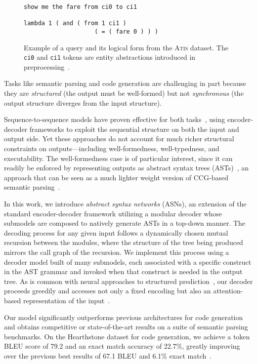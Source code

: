 \documentclass[11pt,a4paper]{article}
\newcommand{\Atis}{\textsc{Atis}\xspace}
\newcommand{\HS}{{\sc Hearthstone}\xspace}
\begin{document}
\begin{figure}[!t]
\footnotesize
\begin{verbatim}
show me the fare from ci0 to ci1 

lambda 1 ( and ( from 1 ci1 ) 
                    ( = ( fare 0 ) ) )
\end{verbatim}
\caption{Example of a query and its logical form from the \Atis dataset. The {\tt ci0} and {\tt ci1} tokens are entity abstractions introduced in preprocessing~\citep{Dong16Semantic}.\label{fig:lambda-example}}
\end{figure}



\noindent Tasks like semantic parsing and code generation are challenging in part because they are \emph{structured} (the output must be well-formed) but not \emph{synchronous} (the output structure diverges from the input structure).

Sequence-to-sequence models have proven effective for both tasks~\citep{Dong16Semantic,Ling16Code}, using encoder-decoder frameworks to exploit the sequential structure on both the input and output side. Yet these approaches do not account for much richer structural constraints on outputs---including well-formedness, well-typedness, and executability. The well-formedness case is of particular interest, since it can readily be enforced by representing outputs as abstract syntax trees (ASTs)~\citep{Aho06Compilers}, an approach that can be seen as a much lighter weight version of CCG-based semantic parsing~\citep{Zettlemoyer05Semantic}.

In this work, we introduce {\it abstract syntax networks} (ASNs), an extension of the standard encoder-decoder framework utilizing a modular decoder whose submodels are composed to natively generate ASTs in a top-down manner. The decoding process for any given input follows a dynamically chosen mutual recursion between the modules, where the structure of the tree being produced mirrors the call graph of the recursion. We implement this process using a decoder model built of many submodels, each associated with a specific construct in the AST grammar and invoked when that construct is needed in the output tree. As is common with neural approaches to structured prediction~\citep{Chen14Fast,Vinyals15Foreign}, our decoder proceeds greedily and accesses not only a fixed encoding but also an attention-based representation of the input~\citep{Bahdanau14Attention}.

Our model significantly outperforms previous architectures for code generation and obtains competitive or state-of-the-art results on a suite of semantic parsing benchmarks. On the \HS dataset for code generation, we achieve a token BLEU score of 79.2 and an exact match accuracy of 22.7\%, greatly improving over the previous best results of 67.1 BLEU and 6.1\% exact match~\citep{Ling16Code}.
\end{document}
